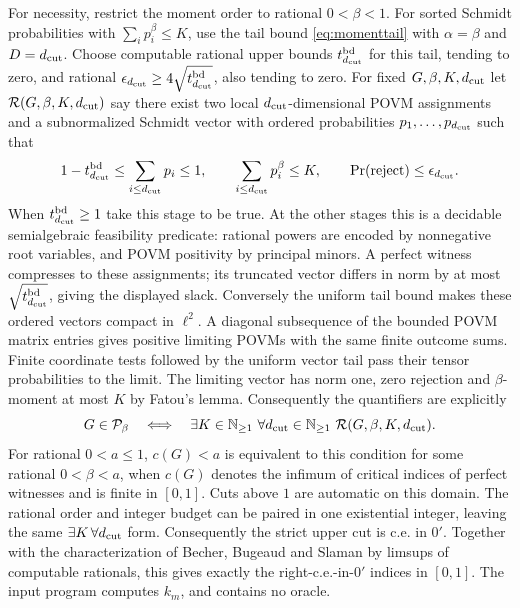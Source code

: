 For necessity, restrict the moment order to rational $0<{\beta}<1$.
For sorted Schmidt probabilities with $\sum_i p_i^{\beta}\le K$, use the tail bound \eqref{eq:momenttail} with $\alpha=\beta$ and $D=d_{\rm cut}$.
Choose computable rational upper bounds $t^{\rm bd}_{d_{\rm cut}}$ for this tail,
tending to zero, and rational $\epsilon_{d_{\rm cut}}\ge4\sqrt{t^{\rm bd}_{d_{\rm cut}}}$,
also tending to zero. For fixed $G,{\beta},K,{d_{\rm cut}}$ let
$\mathcal R(G,{\beta},K,{d_{\rm cut}})$ say there exist two local ${d_{\rm cut}}$-dimensional
POVM assignments and a subnormalized Schmidt vector with ordered
probabilities $p_1,\ldots,p_{d_{\rm cut}}$ such that
\[
 1-t^{\rm bd}_{d_{\rm cut}}\le\sum_{i\le {d_{\rm cut}}}p_i\le1,\qquad
 \sum_{i\le {d_{\rm cut}}}p_i^{\beta}\le K,
 \qquad \Pr(\mathrm{reject})\le\epsilon_{d_{\rm cut}}.
\]
When $t^{\rm bd}_{d_{\rm cut}}\ge1$ take this stage to be true. At the other stages
this is a decidable semialgebraic feasibility predicate: rational
powers are encoded by nonnegative root variables, and POVM
positivity by principal minors. A perfect witness compresses to
these assignments; its truncated vector differs in norm by at most
$\sqrt{t^{\rm bd}_{d_{\rm cut}}}$, giving the displayed slack. Conversely the uniform
tail bound makes these ordered vectors compact in $\ell^2$.
A diagonal subsequence of the bounded POVM matrix entries gives
positive limiting POVMs with the same finite outcome sums. Finite
coordinate tests followed by the uniform vector tail pass their
tensor probabilities to the limit. The limiting vector has norm
one, zero rejection and ${\beta}$-moment at most $K$ by Fatou's lemma.
Consequently the quantifiers are explicitly
\[
 G\in\mathcal P_\beta
 \quad\Longleftrightarrow\quad
 \exists K\in\mathbb N_{\ge1}\ \forall {d_{\rm cut}}\in\mathbb N_{\ge1}\
                         \mathcal R(G,{\beta},K,{d_{\rm cut}}).
\]
For rational $0<a\le1$, $c(G)<a$ is equivalent to this condition for
some rational $0<{\beta}<a$, when $c(G)$ denotes the infimum of
critical indices of perfect witnesses and is finite in $[0,1]$.
Cuts above $1$ are automatic on this domain.
The rational order and integer budget can be paired in one
existential integer, leaving the same $\exists K\,\forall {d_{\rm cut}}$ form.
Consequently the strict upper cut is c.e. in $0'$. Together with the
characterization of Becher, Bugeaud and Slaman \cite[Lemma~4]{BBS} by limsups of computable rationals, this gives exactly the right-c.e.-in-$0'$ indices in
$[0,1]$. The input program computes $k_m$, and contains no oracle.

